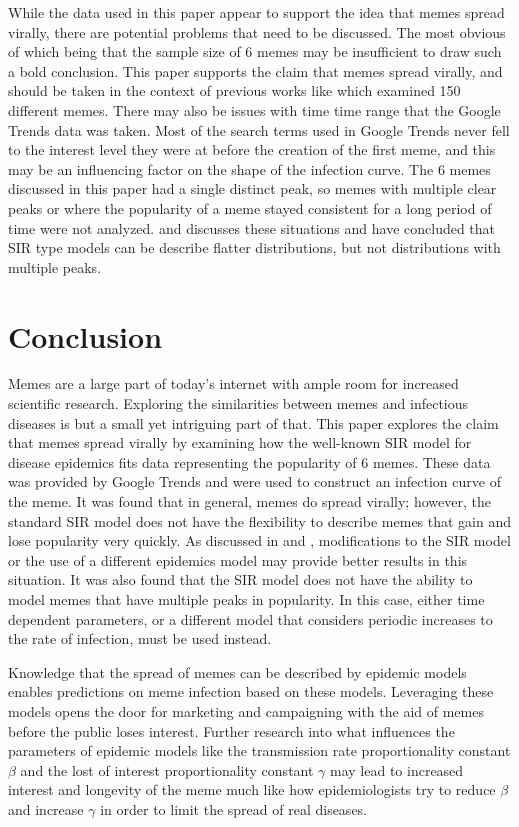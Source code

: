 \documentclass[12pt, letterpaper]{article}
\begin{document}
While the data used in this paper appear to support the idea that memes spread virally, there are potential problems that need to be discussed. The most obvious of which being that the sample size of 6 memes may be insufficient to draw such a bold conclusion. This paper supports the claim that memes spread virally, and should be taken in the context of previous works like \cite{bauckhage2011insights} which examined 150 different memes. There may also be issues with time time range that the Google Trends data was taken. Most of the search terms used in Google Trends never fell to the interest level they were at before the creation of the first meme, and this may be an influencing factor on the shape of the infection curve. The 6 memes discussed in this paper had a single distinct peak, so memes with multiple clear peaks or where the popularity of a meme stayed consistent for a long period of time were not analyzed. \cite{bauckhage2011insights} and \cite{wang2011epidemiological} discusses these situations and have concluded that SIR type models can be describe flatter distributions, but not distributions with multiple peaks.

\section*{Conclusion}
Memes are a large part of today's internet with ample room for increased scientific research. Exploring the similarities between memes and infectious diseases is but a small yet intriguing part of that. This paper explores the claim that memes spread virally by examining how the well-known SIR model for disease epidemics fits data representing the popularity of 6 memes. These data was provided by Google Trends and were used to construct an infection curve of the meme. It was found that in general, memes do spread virally; however, the standard SIR model does not have the flexibility to describe memes that gain and lose popularity very quickly. As discussed in \cite{bauckhage2011insights} and \cite{wang2011epidemiological}, modifications to the SIR model or the use of a different epidemics model may provide better results in this situation. It was also found that the SIR model does not have the ability to model memes that have multiple peaks in popularity. In this case, either time dependent parameters, or a different model that considers periodic increases to the rate of infection, must be used instead.

Knowledge that the spread of memes can be described by epidemic models enables predictions on meme infection based on these models. Leveraging these models opens the door for marketing and campaigning with the aid of memes before the public loses interest. Further research into what influences the parameters of epidemic models like the transmission rate proportionality constant $\beta$ and the lost of interest proportionality constant $\gamma$ may lead to increased interest and longevity of the meme much like how epidemiologists try to reduce $\beta$ and increase $\gamma$ in order to limit the spread of real diseases.


\pagebreak


\end{document}
